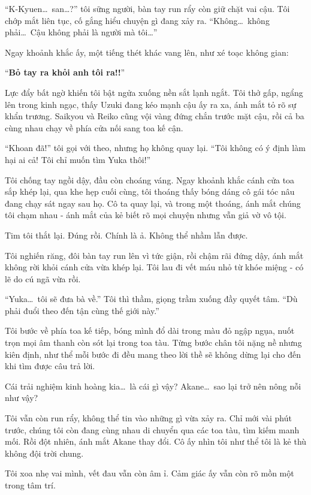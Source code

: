 \documentclass[../main.tex]{subfiles}
\begin{document}
``K-Kyuen\dots\ san\dots?'' tôi sững người, bàn tay run rẩy còn giữ chặt vai cậu. Tôi chớp mắt liên tục, cố gắng hiểu chuyện gì đang xảy ra. ``Không\dots\ không phải\dots\ Cậu không phải là người mà tôi\dots''

Ngay khoảnh khắc ấy, một tiếng thét khác vang lên, như xé toạc không gian:

``\textbf{Bỏ tay ra khỏi anh tôi ra!!}''

Lực đẩy bất ngờ khiến tôi bật ngửa xuống nền sắt lạnh ngắt. Tôi thở gấp, ngẩng lên trong kinh ngạc, thấy Uzuki đang kéo mạnh cậu ấy ra xa, ánh mắt tỏ rõ sự khẩn trương. Saikyou và Reiko cũng vội vàng đứng chắn trước mặt cậu, rồi cả ba cùng nhau chạy về phía cửa nối sang toa kế cận.

``Khoan đã!'' tôi gọi với theo, nhưng họ không quay lại. ``Tôi không có ý định làm hại ai cả! Tôi chỉ muốn tìm Yuka thôi!''

Tôi chống tay ngồi dậy, đầu còn choáng váng. Ngay khoảnh khắc cánh cửa toa sắp khép lại, qua khe hẹp cuối cùng, tôi thoáng thấy bóng dáng cô gái tóc nâu đang chạy sát ngay sau họ. Cô ta quay lại, và trong một thoáng, ánh mắt chúng tôi chạm nhau - ánh mắt của kẻ biết rõ mọi chuyện nhưng vẫn giả vờ vô tội.

Tim tôi thắt lại. Đúng rồi. Chính là ả. Không thể nhầm lẫn được.

Tôi nghiến răng, đôi bàn tay run lên vì tức giận, rồi chậm rãi đứng dậy, ánh mắt không rời khỏi cánh cửa vừa khép lại. Tôi lau đi vết máu nhỏ từ khóe miệng - có lẽ do cú ngã vừa rồi.

``Yuka\dots\ tôi sẽ đưa bà về.'' Tôi thì thầm, giọng trầm xuống đầy quyết tâm. ``Dù phải đuổi theo đến tận cùng thế giới này.''

Tôi bước về phía toa kế tiếp, bóng mình đổ dài trong màu đỏ ngập ngụa, nuốt trọn mọi âm thanh còn sót lại trong toa tàu. Từng bước chân tôi nặng nề nhưng kiên định, như thể mỗi bước đi đều mang theo lời thề sẽ không dừng lại cho đến khi tìm được câu trả lời.


Cái trải nghiệm kinh hoàng kia\dots\ là cái gì vậy? Akane\dots\ sao lại trở nên nông nỗi như vậy?

Tôi vẫn còn run rẩy, không thể tin vào những gì vừa xảy ra. Chỉ mới vài phút trước, chúng tôi còn đang cùng nhau di chuyển qua các toa tàu, tìm kiếm manh mối. Rồi đột nhiên, ánh mắt Akane thay đổi. Cô ấy nhìn tôi như thể tôi là kẻ thù không đội trời chung.

Tôi xoa nhẹ vai mình, vết đau vẫn còn âm ỉ. Cảm giác ấy vẫn còn rõ mồn một trong tâm trí.
\end{document}
